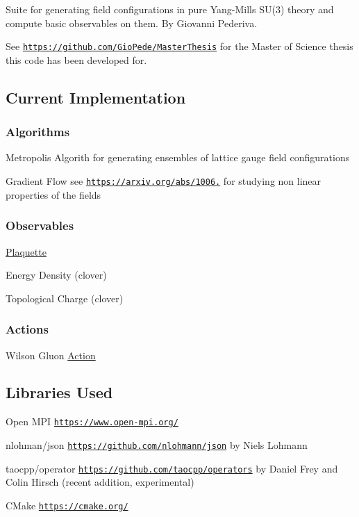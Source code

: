 Suite for generating field configurations in pure Yang-\/\+Mills S\+U(3) theory and compute basic observables on them. By Giovanni Pederiva.

See \href{https://github.com/GioPede/MasterThesis}{\tt https\+://github.\+com/\+Gio\+Pede/\+Master\+Thesis} for the Master of Science thesis this code has been developed for.

\subsection*{Current Implementation}

\subsubsection*{Algorithms}


\begin{DoxyItemize}
\item Metropolis Algorith for generating ensembles of lattice gauge field configurations
\item Gradient Flow see \href{https://arxiv.org/abs/1006.4518}{\tt https\+://arxiv.\+org/abs/1006.} for studying non linear properties of the fields \subsubsection*{Observables}
\end{DoxyItemize}


\begin{DoxyItemize}
\item \hyperlink{classPlaquette}{Plaquette}
\item Energy Density (clover)
\item Topological Charge (clover) \subsubsection*{Actions}
\end{DoxyItemize}


\begin{DoxyItemize}
\item Wilson Gluon \hyperlink{classAction}{Action}
\end{DoxyItemize}

\subsection*{Libraries Used}


\begin{DoxyItemize}
\item Open M\+PI \href{https://www.open-mpi.org/}{\tt https\+://www.\+open-\/mpi.\+org/}
\item nlohman/json \href{https://github.com/nlohmann/json}{\tt https\+://github.\+com/nlohmann/json} by Niels Lohmann
\item taocpp/operator \href{https://github.com/taocpp/operators}{\tt https\+://github.\+com/taocpp/operators} by Daniel Frey and Colin Hirsch (recent addition, experimental)
\item C\+Make \href{https://cmake.org/}{\tt https\+://cmake.\+org/}
\end{DoxyItemize}

